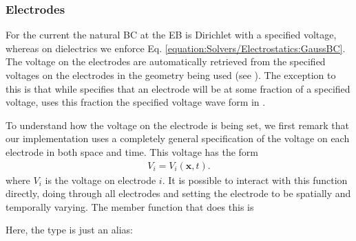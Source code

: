 \documentclass[letterpaper,10pt,english]{sphinxmanual}
\begin{document}
\subsubsection{Electrodes}
\label{\detokenize{Solvers/Electrostatics:electrodes}}
\sphinxAtStartPar
For the current  the natural BC at the EB is Dirichlet with a specified voltage, whereas on dielectrics we enforce Eq. \ref{equation:Solvers/Electrostatics:GaussBC}.
The voltage on the electrodes are automatically retrieved from the specified voltages on the electrodes in the geometry being used (see ).
The exception to this is that while  specifies that an electrode will be at some fraction of a specified voltage,  uses this fraction  the specified voltage wave form in .

\sphinxAtStartPar
To understand how the voltage on the electrode is being set, we first remark that our implementation uses a completely general specification of the voltage on each electrode in both space and time.
This voltage has the form
\begin{equation*}
\begin{split}V_i = V_i\left(\mathbf{x}, t\right).\end{split}
\end{equation*}
\sphinxAtStartPar
where \(V_i\) is the voltage on electrode \(i\).
It is possible to interact with this function directly, doing through all electrodes and setting the electrode to be spatially and temporally varying.
The member function that does this is

\begin{sphinxVerbatim}[commandchars=\\\{\},formatcom=\scriptsize]
   
                                                  
\end{sphinxVerbatim}

\sphinxAtStartPar
Here, the type  is just an alias:

\begin{sphinxVerbatim}[commandchars=\\\{\},formatcom=\scriptsize]
        
\end{sphinxVerbatim}
\end{document}
